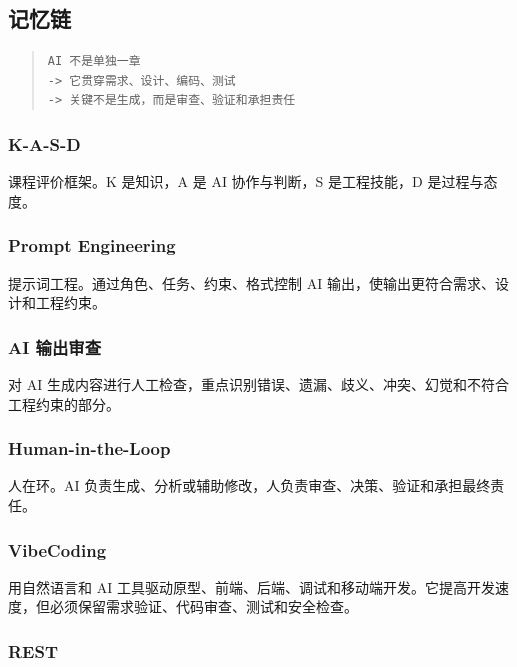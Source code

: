 \documentclass[UTF8,zihao=-4]{ctexart}
\begin{document}
\subsection{记忆链}


\begin{quote}
\footnotesize
\begin{verbatim}
AI 不是单独一章
-> 它贯穿需求、设计、编码、测试
-> 关键不是生成，而是审查、验证和承担责任
\end{verbatim}
\end{quote}


\subsubsection*{K-A-S-D}


课程评价框架。K 是知识，A 是 AI 协作与判断，S 是工程技能，D 是过程与态度。


\subsubsection*{Prompt Engineering}


提示词工程。通过角色、任务、约束、格式控制 AI 输出，使输出更符合需求、设计和工程约束。


\subsubsection*{AI 输出审查}


对 AI 生成内容进行人工检查，重点识别错误、遗漏、歧义、冲突、幻觉和不符合工程约束的部分。


\subsubsection*{Human-in-the-Loop}


人在环。AI 负责生成、分析或辅助修改，人负责审查、决策、验证和承担最终责任。


\subsubsection*{VibeCoding}


用自然语言和 AI 工具驱动原型、前端、后端、调试和移动端开发。它提高开发速度，但必须保留需求验证、代码审查、测试和安全检查。


\subsubsection*{REST}
\end{document}

